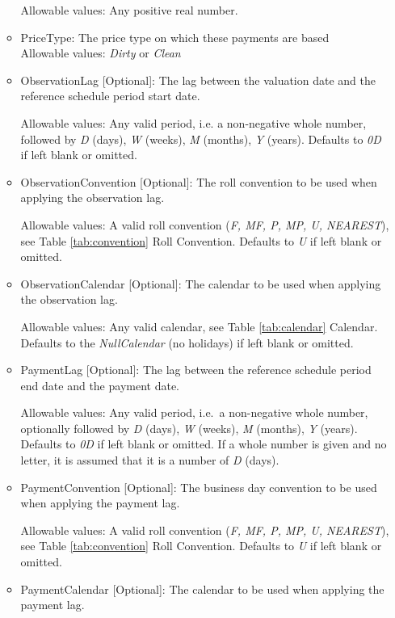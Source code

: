\begin{itemize}
\begin{itemize}
    Allowable values: Any positive real number.

  \item PriceType: The price type on which these payments are based\\
    Allowable values: \emph{Dirty} or \emph{Clean}

  \item ObservationLag [Optional]: The lag between the valuation date and the reference schedule period start date.
  
    Allowable values: Any valid period, i.e. a non-negative whole number, followed by \emph{D} (days), \emph{W} (weeks), \emph{M} (months), \emph{Y} (years). Defaults to \emph{0D} if left blank or omitted.
    
  \item ObservationConvention [Optional]: The roll convention to be used when applying the observation lag.
  
    Allowable values: A valid roll convention (\emph{F, MF, P, MP, U, NEAREST}), see Table \ref{tab:convention} Roll Convention. Defaults to \emph{U} if left blank or omitted.
    
  \item ObservationCalendar [Optional]: The calendar to be used when applying the observation lag.
  
      Allowable values: Any valid calendar, see Table \ref{tab:calendar} Calendar. Defaults to the \emph{NullCalendar} (no holidays) if left blank or omitted.
      
  \item PaymentLag [Optional]: The lag between the reference schedule period end date and the payment date.
  
    Allowable values: Any valid period, i.e.\ a non-negative whole number, optionally followed by \emph{D} (days), \emph{W} (weeks), \emph{M} (months),
  \emph{Y} (years). Defaults to \emph{0D} if left blank or omitted. If a whole number is given and no letter, it is assumed that it is a number of  \emph{D} (days).
    
  \item PaymentConvention [Optional]: The business day convention to be used when applying the payment lag.
  
    Allowable values: A valid roll convention (\emph{F, MF, P, MP, U, NEAREST}), see Table \ref{tab:convention} Roll Convention. Defaults to \emph{U} if left blank or omitted.
    
  \item PaymentCalendar [Optional]: The calendar to be used when applying the payment lag.
  

\end{itemize}
\end{itemize}
